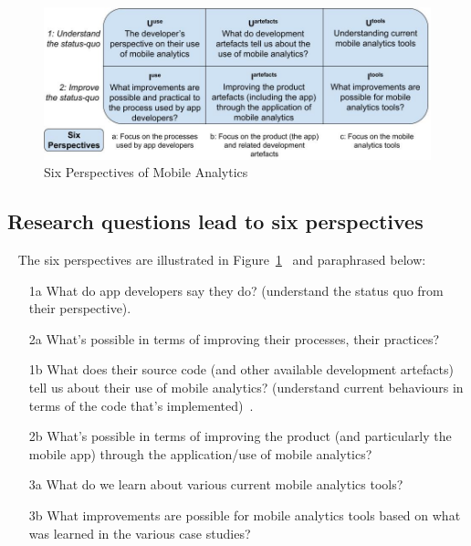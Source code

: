\begin{figure}
    \includegraphics[width=\linewidth]{images/my/six-perspectives-2x3-matrix-12-nov-2021.jpeg}
    \caption{Six Perspectives of Mobile Analytics}
    \label{fig:six-perspectives-in-the-research-questions-section}
\end{figure}

\subsection{Research questions lead to six perspectives}~\label{rq-leads-to-six-perspectives}
The six perspectives are illustrated in Figure~\ref{fig:six-perspectives-in-the-research-questions-section}~ and paraphrased below:
{\footnotesize
\begin{enumerate}
    \item [1a] What do app developers say they do? (understand the status quo from their perspective).
    \item [2a] What's possible in terms of improving their processes, their practices?
    \item [1b] What does their source code (and other available development artefacts) tell us about their use of mobile analytics? (understand current behaviours in terms of the code that's implemented)~.
    \item [2b] What's possible in terms of improving the product (and particularly the mobile app) through the application/use of mobile analytics?
    \item [3a] What do we learn about various current mobile analytics tools?
    \item [3b] What improvements are possible for mobile analytics tools based on what was learned in the various case studies?
\end{enumerate}
}

